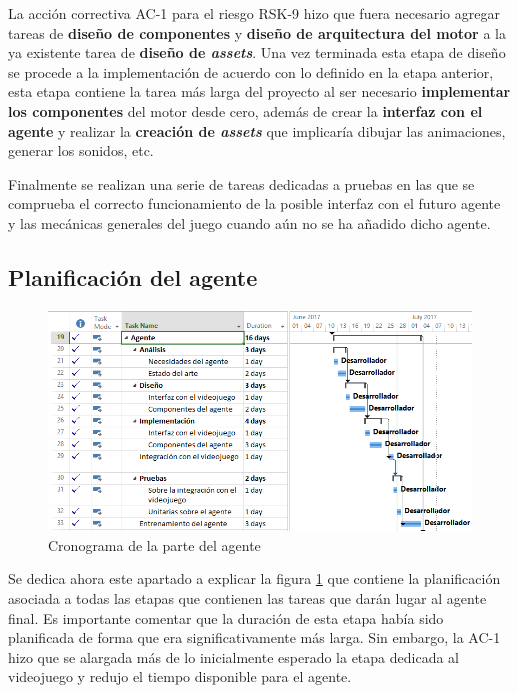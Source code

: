 \bigskip

La acción correctiva AC-1 para el riesgo RSK-9 hizo que fuera necesario agregar tareas de \textbf{diseño de componentes} y \textbf{diseño de arquitectura del motor} a la ya existente tarea de \textbf{diseño de \textit{assets}}. Una vez terminada esta etapa de diseño se procede a la implementación de acuerdo con lo definido en la etapa anterior, esta etapa contiene la tarea más larga del proyecto al ser necesario \textbf{implementar los componentes} del motor desde cero, además de crear la \textbf{interfaz con el agente} y realizar la \textbf{creación de \textit{assets}} que implicaría dibujar las animaciones, generar los sonidos, etc.

\bigskip

Finalmente se realizan una serie de tareas dedicadas a pruebas en las que se comprueba el correcto funcionamiento de la posible interfaz con el futuro agente y las mecánicas generales del juego cuando aún no se ha añadido dicho agente.


\subsection{Planificación del agente}

\begin{figure}
	\centerline{\includegraphics[width=17cm]{otros/capturasPlanificacion/agente.PNG}}
	\caption{Cronograma de la parte del agente}
	\label{plan:agente}
\end{figure}

Se dedica ahora este apartado a explicar la figura \ref{plan:agente} que contiene la planificación asociada a todas las etapas que contienen las tareas que darán lugar al agente final. Es importante comentar que la duración de esta etapa había sido planificada de forma que era significativamente más larga. Sin embargo, la AC-1 hizo que se alargada más de lo inicialmente esperado la etapa dedicada al videojuego y redujo el tiempo disponible para el agente.


